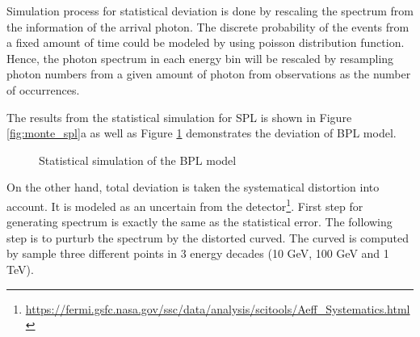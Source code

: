 Simulation process for statistical deviation is done by 
rescaling the spectrum from the information of the arrival photon.
The discrete probability of the events from a fixed amount
of time could be modeled by using poisson distribution function.
Hence, the photon spectrum in each energy bin will be rescaled
by resampling photon numbers from a given amount of photon 
from observations as the number of occurrences.

The results from the statistical simulation for SPL is shown in 
Figure \ref{fig:monte_spl}a as well as Figure \ref{fig:monte_bpl_stat}
demonstrates the deviation of BPL model.

\begin{figure}[h!]
    \centering
        \caption{Statistical simulation of the BPL model}
       \label{fig:monte_bpl_stat}
\end{figure}

On the other hand, total deviation is taken the systematical distortion
into account. It is modeled as an uncertain from the detector\footnote{\url{https://fermi.gsfc.nasa.gov/ssc/data/analysis/scitools/Aeff_Systematics.html}}.
First step for generating spectrum is exactly the same as the 
statistical error. The following step is to purturb the spectrum
by the distorted curved. The curved is computed by sample three 
different points in 3 energy decades (10 GeV, 100 GeV and 1 TeV).


